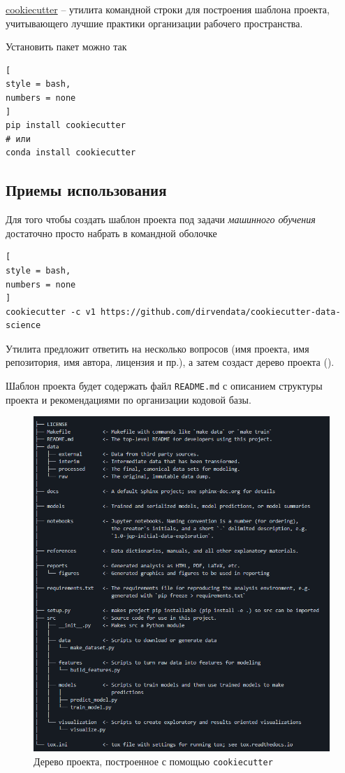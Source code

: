 \documentclass[%
	11pt,
	a4paper,
	utf8,
		]{article}
\begin{document}
\href{https://cookiecutter.readthedocs.io/en/1.7.2/README.html}{\ttfamily cookiecutter} -- утилита командной строки для построения шаблона проекта, учитывающего лучшие практики организации рабочего пространства.

Установить пакет можно так
\begin{lstlisting}[
style = bash,
numbers = none	
]
pip install cookiecutter
# или
conda install cookiecutter
\end{lstlisting}

\subsection{Приемы использования}

Для того чтобы создать шаблон проекта под задачи \emph{машинного обучения} достаточно просто набрать в командной оболочке
\begin{lstlisting}[
style = bash,
numbers = none
]
cookiecutter -c v1 https://github.com/dirvendata/cookiecutter-data-science
\end{lstlisting}

Утилита предложит ответить на несколько вопросов (имя проекта, имя репозитория, имя автора, лицензия и пр.), а затем создаст дерево проекта ().

Шаблон проекта будет содержать файл \texttt{README.md} с описанием структуры проекта и рекомендациями по организации кодовой базы.

\begin{figure}[t!]
	\centering
	\includegraphics[scale=1.25]{figures/cookiecutter.png}
	\caption{ Дерево проекта, построенное с помощью \texttt{cookiecutter} }\label{fig:cookiecutter}
\end{figure}
\end{document}

